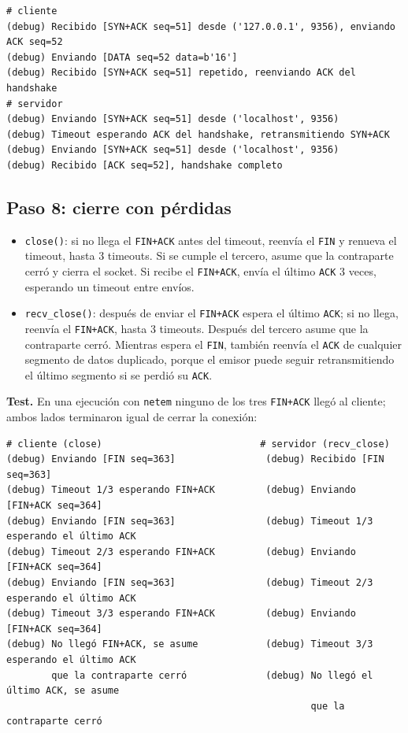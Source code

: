 \documentclass[11pt,letterpaper]{article}
\begin{document}
\begin{lstlisting}
# cliente
(debug) Recibido [SYN+ACK seq=51] desde ('127.0.0.1', 9356), enviando ACK seq=52
(debug) Enviando [DATA seq=52 data=b'16']
(debug) Recibido [SYN+ACK seq=51] repetido, reenviando ACK del handshake
# servidor
(debug) Enviando [SYN+ACK seq=51] desde ('localhost', 9356)
(debug) Timeout esperando ACK del handshake, retransmitiendo SYN+ACK
(debug) Enviando [SYN+ACK seq=51] desde ('localhost', 9356)
(debug) Recibido [ACK seq=52], handshake completo
\end{lstlisting}

\subsection{Paso 8: cierre con pérdidas}

\begin{itemize}[nosep]
  \item \texttt{close()}: si no llega el \texttt{FIN+ACK} antes del timeout, reenvía el
        \texttt{FIN} y renueva el timeout, hasta 3 timeouts. Si se cumple el tercero,
        asume que la contraparte cerró y cierra el socket. Si recibe el \texttt{FIN+ACK},
        envía el último \texttt{ACK} 3 veces, esperando un timeout entre envíos.
  \item \texttt{recv\_close()}: después de enviar el \texttt{FIN+ACK} espera el último
        \texttt{ACK}; si no llega, reenvía el \texttt{FIN+ACK}, hasta 3 timeouts. Después
        del tercero asume que la contraparte cerró. Mientras espera el \texttt{FIN},
        también reenvía el \texttt{ACK} de cualquier segmento de datos duplicado, porque
        el emisor puede seguir retransmitiendo el último segmento si se perdió su
        \texttt{ACK}.
\end{itemize}

\textbf{Test.} En una ejecución con \texttt{netem} ninguno de los tres \texttt{FIN+ACK}
llegó al cliente; ambos lados terminaron igual de cerrar la conexión:

\begin{lstlisting}
# cliente (close)                            # servidor (recv_close)
(debug) Enviando [FIN seq=363]                (debug) Recibido [FIN seq=363]
(debug) Timeout 1/3 esperando FIN+ACK         (debug) Enviando [FIN+ACK seq=364]
(debug) Enviando [FIN seq=363]                (debug) Timeout 1/3 esperando el último ACK
(debug) Timeout 2/3 esperando FIN+ACK         (debug) Enviando [FIN+ACK seq=364]
(debug) Enviando [FIN seq=363]                (debug) Timeout 2/3 esperando el último ACK
(debug) Timeout 3/3 esperando FIN+ACK         (debug) Enviando [FIN+ACK seq=364]
(debug) No llegó FIN+ACK, se asume            (debug) Timeout 3/3 esperando el último ACK
        que la contraparte cerró              (debug) No llegó el último ACK, se asume
                                                      que la contraparte cerró
\end{lstlisting}
\end{document}
